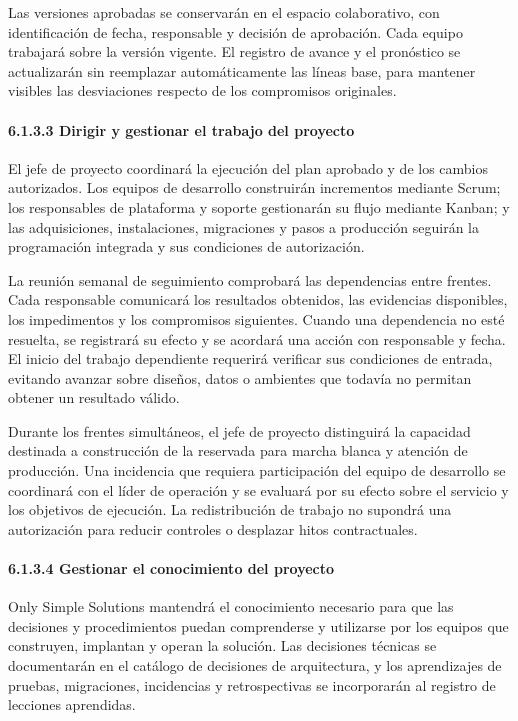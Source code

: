 \documentclass[11pt]{article}
\begin{document}
Las versiones aprobadas se conservarán en el espacio colaborativo, con
identificación de fecha, responsable y decisión de aprobación. Cada
equipo trabajará sobre la versión vigente. El registro de avance y el
pronóstico se actualizarán sin reemplazar automáticamente las líneas
base, para mantener visibles las desviaciones respecto de los
compromisos originales.

\paragraph{6.1.3.3 Dirigir y gestionar el trabajo del proyecto}\label{6-1-3-3-dirigir-y-gestionar-el-trabajo-del-proyecto}

El jefe de proyecto coordinará la ejecución del plan aprobado y de los cambios autorizados. Los equipos de desarrollo construirán incrementos mediante Scrum; los responsables de plataforma y soporte gestionarán su flujo mediante Kanban; y las adquisiciones, instalaciones, migraciones y pasos a producción seguirán la programación integrada y sus condiciones de autorización.

La reunión semanal de seguimiento comprobará las dependencias entre
frentes. Cada responsable comunicará los resultados obtenidos, las
evidencias disponibles, los impedimentos y los compromisos siguientes.
Cuando una dependencia no esté resuelta, se registrará su efecto y se
acordará una acción con responsable y fecha. El inicio del trabajo
dependiente requerirá verificar sus condiciones de entrada, evitando
avanzar sobre diseños, datos o ambientes que todavía no permitan obtener
un resultado válido.

Durante los frentes simultáneos, el jefe de proyecto distinguirá la
capacidad destinada a construcción de la reservada para marcha blanca y
atención de producción. Una incidencia que requiera participación del
equipo de desarrollo se coordinará con el líder de operación y se
evaluará por su efecto sobre el servicio y los objetivos de ejecución.
La redistribución de trabajo no supondrá una autorización para reducir
controles o desplazar hitos contractuales.

\paragraph{6.1.3.4 Gestionar el conocimiento del proyecto}\label{6-1-3-4-gestionar-el-conocimiento-del-proyecto}

Only Simple Solutions mantendrá el conocimiento necesario para que las decisiones y procedimientos puedan comprenderse y utilizarse por los equipos que construyen, implantan y operan la solución. Las decisiones técnicas se documentarán en el catálogo de decisiones de arquitectura, y los aprendizajes de pruebas, migraciones, incidencias y retrospectivas se incorporarán al registro de lecciones aprendidas.
\end{document}
